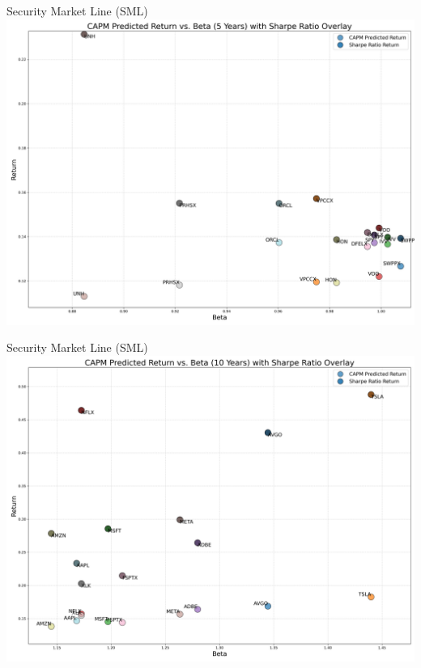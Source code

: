 \documentclass{beamer}
\begin{document}
\begin{frame}{Security Market Line (SML)}
    \centering
    \includegraphics[height=0.8\textheight]{capm_vs_sharpe_5_years.png}
\end{frame}

\begin{frame}{Security Market Line (SML)}
    \centering
    \includegraphics[height=0.8\textheight]{capm_vs_sharpe_10_years.png}
\end{frame}
\end{document}
